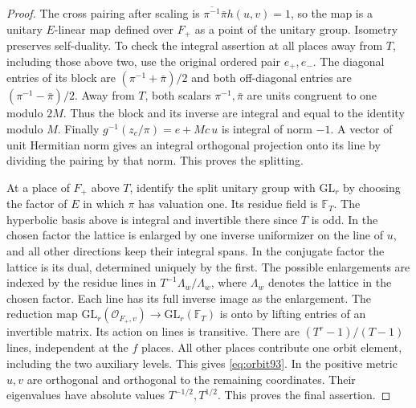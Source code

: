 \documentclass[a4paper,11pt]{article}
\theoremstyle{definition}
\theoremstyle{remark}
\numberwithin{equation}{section}
\begin{document}
\begin{proof}
The cross pairing after scaling is
\(\overline{\pi^{-1}}\bar\pi h(u,v)=1\), so the map is a
unitary \(E\)-linear map defined over \(F_+\) as a point of
the unitary group. Isometry preserves self-duality. To check
the integral assertion at all places away from \(T\), including
those above two, use the original ordered pair \(e_+,e_-\).
The diagonal entries of its block are
\((\pi^{-1}+\bar\pi)/2\) and both off-diagonal entries are
\((\pi^{-1}-\bar\pi)/2\). Away from \(T\), both scalars
\(\pi^{-1},\bar\pi\) are units congruent to one modulo \(2M\).
Thus the block and its inverse are integral and equal to the
identity modulo \(M\). Finally \(g^{-1}(z_c/\pi)=e+Mc\,u\)
is integral of norm \(-1\). A vector of unit Hermitian norm
gives an integral orthogonal projection onto its line by
dividing the pairing by that norm. This proves the splitting.

At a place of \(F_+\) above \(T\), identify the split unitary
group with \(\mathrm{GL}_r\) by choosing the factor of \(E\)
in which \(\pi\) has valuation one. Its residue field is
\(\mathbb F_T\). The hyperbolic basis above is integral and
invertible there since \(T\) is odd. In the chosen factor the
lattice is enlarged by one inverse uniformizer on the line
of \(u\), and all other directions keep their integral spans.
In the conjugate factor the lattice is its dual, determined
uniquely by the first. The possible enlargements are indexed
by the residue lines in \(T^{-1}\Lambda_w/\Lambda_w\), where
\(\Lambda_w\) denotes the lattice in the chosen factor. Each
line has its full inverse image as the enlargement.
The reduction map
\(\mathrm{GL}_r(\mathcal O_{F_+,v})\to\mathrm{GL}_r(\mathbb F_T)\)
is onto by lifting entries of an invertible matrix. Its action
on lines is transitive. There are \((T^r-1)/(T-1)\) lines,
independent at the \(f\) places. All other places contribute
one orbit element, including the two auxiliary levels. This
gives \eqref{eq:orbit93}. In the positive metric \(u,v\) are orthogonal
and orthogonal to the remaining coordinates. Their eigenvalues
have absolute values \(T^{-1/2},T^{1/2}\). This proves the final
assertion.
\end{proof}
\end{document}
